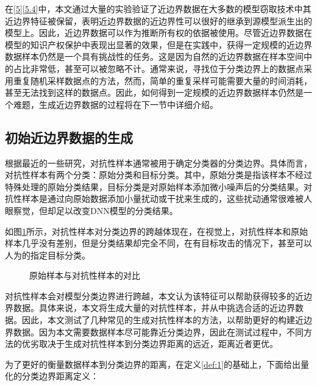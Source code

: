在\ref{5}\ref{5.4}中，本文通过大量的实验验证了近边界数据在大多数的模型窃取技术中其近边界特征被保留，表明近边界数据的近边界性可以很好的继承到源模型派生出的模型上。因此，近边界数据可以作为推断所有权的依据被使用。尽管近边界数据在模型的知识产权保护中表现出显著的效果，但是在实践中，获得一定规模的近边界数据样本仍然是一个具有挑战性的任务。这是因为自然的近边界数据在样本空间中的占比非常低，甚至可以被忽略不计。通常来说，寻找位于分类边界上的数据点采用重复随机采样数据点的方法，然而，简单的重复采样可能需要大量的时间消耗，甚至无法找到这样的数据点。因此，如何得到一定规模的近边界数据样本仍然是一个难题，生成近边界数据的过程将在下一节中详细介绍。

\subsection{初始近边界数据的生成}

根据最近的一些研究\cite{cao2021ipguard}，对抗性样本通常被用于确定分类器的分类边界。具体而言，对抗性样本有两个分类：原始分类和目标分类。其中，原始分类是指该样本不经过特殊处理的原始分类结果，目标分类是对原始样本添加微小噪声后的分类结果。对抗性样本是通过向原始数据添加小量扰动或干扰来生成的，这些扰动通常很难被人眼察觉，但却足以改变DNN模型的分类结果。

如图\ref{原始样本与对抗性样本对比}所示，对抗性样本对分类边界的跨越体现在，在视觉上，对抗性样本和原始样本几乎没有差别，但是分类结果却完全不同，在有目标攻击的情况下，甚至可以人为的指定目标分类。

\begin{figure}[htb]%
\setlength{\abovecaptionskip}{3mm} %
\vspace{-2mm}
\setlength{\belowcaptionskip}{-3mm} %
\caption{原始样本与对抗性样本的对比}
\label{原始样本与对抗性样本对比}
\end {figure}

对抗性样本会对模型分类边界进行跨越，本文认为该特征可以帮助获得较多的近边界数据。具体来说，本文将生成大量的对抗性样本，并从中挑选合适的近边界数据。因此，本文测试了几种常见的生成对抗性样本的方法，以帮助更好的构建近边界数据。因为本文需要数据样本尽可能靠近分类边界，因此在测试过程中，不同方法的优劣取决于生成对抗性样本到分类边界距离的远近，距离近者更优。

为了更好的衡量数据样本到分类边界的距离，在定义\ref{def:1}的基础上，下面给出量化的分类边界距离定义：

